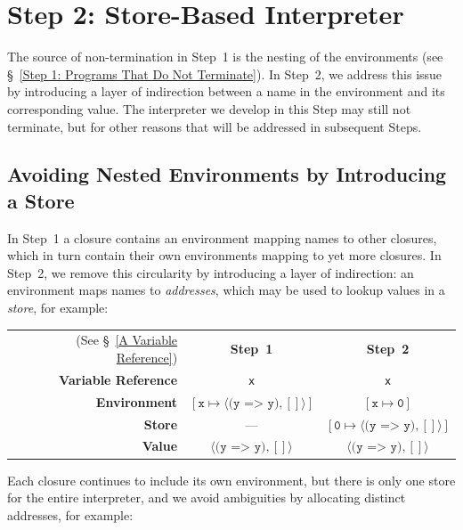 \documentclass[12pt, oneside]{book}
\begin{document}
\section{Step 2: Store-Based Interpreter}

The source of non-termination in Step~1 is the nesting of the environments (see §~\ref{Step 1: Programs That Do Not Terminate}). In Step~2, we address this issue by introducing a layer of indirection between a name in the environment and its corresponding value. The interpreter we develop in this Step may still not terminate, but for other reasons that will be addressed in subsequent Steps.

\subsection{Avoiding Nested Environments by Introducing a Store}

In Step~1 a closure contains an environment mapping names to other closures, which in turn contain their own environments mapping to yet more closures. In Step~2, we remove this circularity by introducing a layer of indirection: an environment maps names to \emph{addresses}, which may be used to lookup values in a \emph{store}, for example:

\begin{center}
\begin{tabular}{rcc}
(See §~\ref{A Variable Reference}) & \textbf{Step~1} & \textbf{Step~2} \\
\textbf{Variable Reference} & \texttt{x} & \texttt{x} \\
\textbf{Environment} & $[\texttt{x} \mapsto \langle \texttt{(y => y)}, [] \rangle]$ & $[\texttt{x} \mapsto \texttt{0}]$ \\
\textbf{Store} & — & $[\texttt{0} \mapsto \langle \texttt{(y => y)}, [] \rangle]$ \\
\textbf{Value} & $\langle \texttt{(y => y)}, [] \rangle$ & $\langle \texttt{(y => y)}, [] \rangle$ \\
\end{tabular}
\end{center}

Each closure continues to include its own environment, but there is only one store for the entire interpreter, and we avoid ambiguities by allocating distinct addresses, for example:
\end{document}
